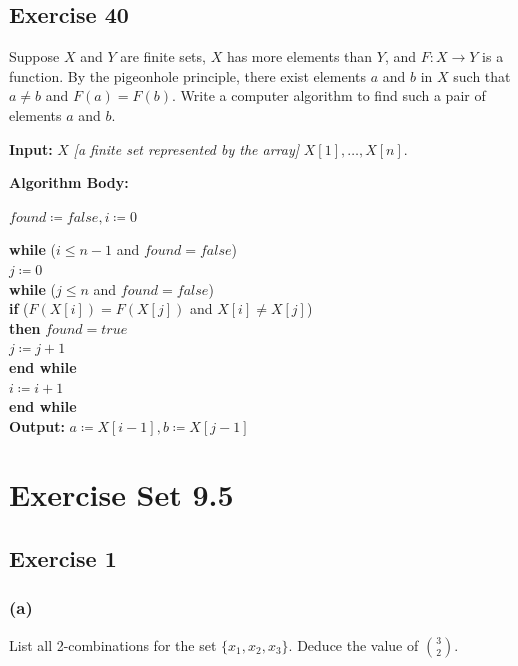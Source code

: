 \documentclass[14pt]{extarticle}
\begin{document}
\subsection{Exercise 40}
Suppose \(X\) and \(Y\) are finite sets, \(X\) has more elements than \(Y\), and \(F: X \to Y\) is a function. By 
the pigeonhole principle, there exist elements \(a\) and \(b\) in \(X\) such that \(a \neq b\) and \(F(a) = F(b)\). 
Write a computer algorithm to find such a pair of elements \(a\) and \(b\).

\begin{tcolorbox}[colframe=cyan]
{\bf Input:} \(X\) {\it [a finite set represented by the array]} \(X[1], \ldots, X[n]\). 

{\bf Algorithm Body:}

\(found \coloneqq false, i \coloneqq 0\)

\begin{tabbing}
{\bf wh}\={\bf ile} (\(i \leq n-1\) and \(found = false\)) \\
        \> \(j \coloneqq 0\) \\
        \> {\bf wh}\={\bf ile} (\(j \leq n\) and \(found = false\))\\
        \>         \> {\bf if} (\(F(X[i]) = F(X[j])\) and \(X[i] \neq X[j]\)) \\
        \>         \> {\bf then} \(found = true\) \\
        \>         \> \(j \coloneqq j+1\) \\
        \> {\bf end while} \\
        \> \(i \coloneqq i+1\) \\
{\bf end while} \\
{\bf Output:} \(a \coloneqq X[i-1], b \coloneqq X[j-1]\) 
\end{tabbing}
\end{tcolorbox}

\section{Exercise Set 9.5}

\subsection{Exercise 1}
\subsubsection{(a)}
List all 2-combinations for the set \(\{x_1, x_2, x_3\}\). Deduce the value of \(\binom{3}{2}\).
\end{document}
